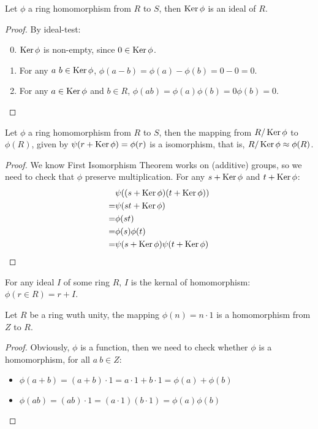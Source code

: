 \documentclass[../main.tex]{subfiles}
\begin{document}
\begin{theorem}
  Let $\phi$ a ring homomorphism from $R$ to $S$, then $\operatorname{Ker} \phi$ is an ideal of $R$.
\end{theorem}
\begin{proof}
  By ideal-test:
  \begin{enumerate}
    \setcounter{enumi}{-1}
    \item $\operatorname{Ker} \phi$ is non-empty, since $0 \in \operatorname{Ker} \phi$.
    \item For any $a \ b \in \operatorname{Ker} \phi$, $\phi(a - b) = \phi(a) - \phi(b) = 0 - 0 = 0$.
    \item For any $a \in \operatorname{Ker} \phi$ and $b \in R$, $\phi(ab) = \phi(a)\phi(b) = 0\phi(b) = 0$.
  \end{enumerate}
\end{proof}

\begin{theorem}
  Let $\phi$ a ring homomorphism from $R$ to $S$, then the mapping
  from $R/\operatorname{Ker} \phi$ to $\phi(R)$, given by $\psi(r + \operatorname{Ker} \phi) = \phi(r)$
  is a isomorphism, that is, $R / \operatorname{Ker} \phi \approx \phi(R)$.
\end{theorem}
\begin{proof}
  We know First Isomorphism Theorem works on (additive) groups, so we need to check that
  $\phi$ preserve multiplication.
  For any $s + \operatorname{Ker} \phi$ and $t + \operatorname{Ker} \phi$:
  \begin{align*}
     & \psi((s + \operatorname{Ker} \phi)(t + \operatorname{Ker} \phi)) \\
    =& \psi(st + \operatorname{Ker} \phi) \\
    =& \phi(st) \\
    =& \phi(s)\phi(t) \\
    =& \psi(s + \operatorname{Ker} \phi)\psi(t + \operatorname{Ker} \phi)
  \end{align*}
\end{proof}

\begin{theorem}
  For any ideal $I$ of some ring $R$, $I$ is the kernal of homomorphism:
  $\phi(r \in R) = r + I$.
\end{theorem}

\begin{theorem}
  Let $R$ be a ring wuth unity, the mapping $\phi(n) = n \cdot 1$
  is a homomorphism from $Z$ to $R$.
\end{theorem}
\begin{proof}
  Obviously, $\phi$ is a function, then we need to check whether $\phi$ is a homomorphism,
  for all $a \ b \in Z$:
  \begin{itemize}
    \item $\phi(a + b) = (a + b) \cdot 1 = a \cdot 1 + b \cdot 1 = \phi(a) + \phi(b)$
    \item $\phi(ab) = (ab) \cdot 1 = (a \cdot 1)(b \cdot 1) = \phi(a)\phi(b)$
  \end{itemize}
\end{proof}
\end{document}
